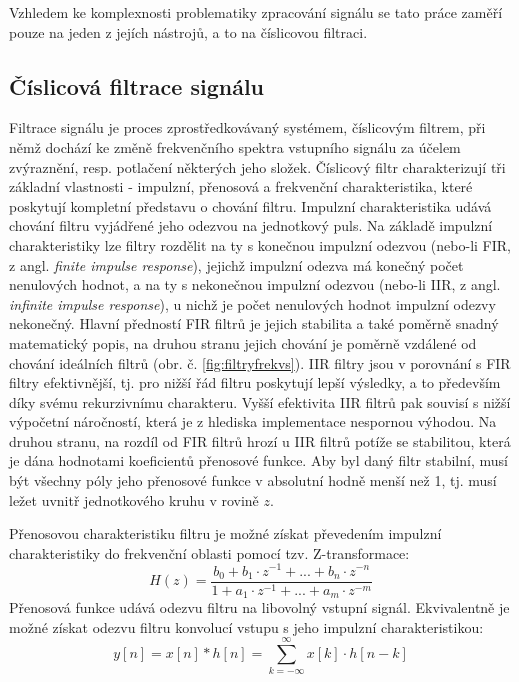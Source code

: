\documentclass[a4paper, 12pt]{article}
\begin{document}
\noindent Vzhledem ke komplexnosti problematiky zpracování signálu se tato práce zaměří pouze na jeden z jejích nástrojů, a to na číslicovou filtraci.

\subsection{Číslicová filtrace signálu} \label{sec:filtry)}
Filtrace signálu je proces zprostředkovávaný systémem, číslicovým filtrem, při němž dochází ke změně frekvenčního spektra vstupního signálu za účelem zvýraznění, resp. potlačení některých jeho složek. \cite{filtracedef}
Číslicový filtr charakterizují tři základní vlastnosti - impulzní, přenosová a frekvenční charakteristika, které poskytují kompletní představu o chování filtru. Impulzní charakteristika udává chování filtru vyjádřené jeho odezvou na jednotkový puls. Na základě impulzní charakteristiky lze filtry rozdělit na ty s konečnou  impulzní odezvou (nebo-li FIR, z angl. \textit{finite impulse response}), jejichž impulzní odezva má konečný počet nenulových hodnot, a na ty s nekonečnou impulzní odezvou (nebo-li IIR, z angl. \textit{infinite impulse response}), u nichž je počet nenulových hodnot impulzní odezvy nekonečný. Hlavní předností FIR filtrů je jejich stabilita a také poměrně snadný matematický popis, na druhou stranu jejich chování je poměrně vzdálené od chování ideálních filtrů (obr. č. \ref{fig:filtryfrekvs}). IIR filtry jsou v porovnání s FIR filtry efektivnější, tj. pro nižší řád filtru poskytují lepší výsledky, a to především díky svému rekurzivnímu charakteru. Vyšší efektivita IIR filtrů pak souvisí s nižší výpočetní náročností, která je z hlediska implementace nespornou výhodou. Na druhou stranu, na rozdíl od FIR filtrů hrozí u IIR filtrů potíže se stabilitou, která je dána hodnotami koeficientů přenosové funkce. Aby byl daný filtr stabilní, musí být všechny póly jeho přenosové funkce v absolutní hodně menší než 1, tj. musí ležet uvnitř jednotkového kruhu v rovině $z$. \cite{iir}

Přenosovou charakteristiku filtru je možné získat převedením impulzní charakteristiky do frekvenční oblasti pomocí tzv. Z-transformace:
\begin{equation}
H (z) = \frac{b_0 + b_1·z^{-1} + ... + b_n·z^{-n}}{1 + a_1·z^{-1} + ... + a_m·z^{-m}}
\end{equation}
Přenosová funkce udává odezvu filtru na libovolný vstupní signál. Ekvivalentně je možné získat odezvu filtru konvolucí vstupu s jeho impulzní charakteristikou:
\begin{equation}
y [n] = x [n] * h [n] = \sum_{k = -\infty}^{\infty} x[k]·h[n-k]
\end{equation}
\end{document}
